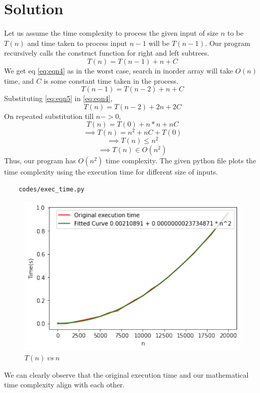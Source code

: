 \documentclass[journal,12pt,twocolumn]{IEEEtran}
\begin{document}
\section{Solution}
Let us assume the time complexity to process the given input of size $n$ to be $T(n)$ and time taken to process input $n-1$ will be $T(n-1)$. Our program recursively calls the construct function for right and left subtrees. 
\begin{equation}
\label{eq:eqn4}
 T(n) = T(n-1) + n + C
\end{equation}
 We get eq \eqref{eq:eqn4} as in the worst case, search in inorder array will take $O(n)$ time, and $C$ is some constant time taken in the process.
\begin{equation}
\label{eq:eqn5}
 T(n-1) = T(n-2) + n + C
\end{equation}
Substituting \eqref{eq:eqn5} in \eqref{eq:eqn4},
\begin{equation}
 T(n) = T(n-2) + 2n + 2C
\end{equation}
On repeated substitution till $n->0$,
\begin{equation}
 T(n) = T(0) + n*n + nC
\end{equation}
\begin{equation}
 \implies T(n) = n^2 + nC + T(0)
\end{equation}
\begin{equation}
 \implies T(n) \leq n^2
\end{equation}
\begin{equation}
 \implies T(n) \in O(n^2)
\end{equation}
Thus, our program has $O(n^2)$ time complexity.
The given python file plots the time complexity using the execution time for different size of inputs.
\begin{lstlisting}
    codes/exec_time.py
\end{lstlisting}
\begin{figure}[!ht]
\centering
\includegraphics[width=\columnwidth]{./figs/plot}
\caption{$T(n)\: vs \: n$}
\label{fig:time}
\end{figure}
We can clearly observe that the original execution time and our mathematical time complexity align with each other.
\end{document}
